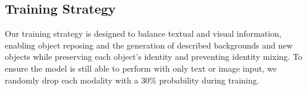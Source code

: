 

\subsection{Training Strategy}
\label{sec:training}


Our training strategy is designed to balance textual and visual information, enabling object reposing and the generation of described backgrounds and new objects while preserving each object's identity and preventing identity mixing. To ensure the model is still able to perform with only text or image input, we randomly drop each modality with a 30\% probability during training. %


